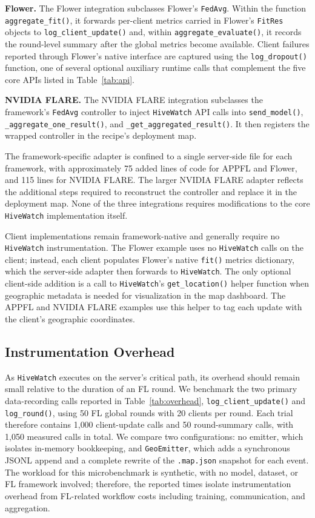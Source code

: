 \documentclass[preprint,12pt, a4paper]{elsarticle}
\begin{document}
\textbf{Flower.} The Flower integration subclasses Flower’s \texttt{FedAvg}.
Within the function \texttt{aggregate\_fit()}, it forwards per-client metrics carried in Flower's \texttt{FitRes} objects to \texttt{log\_client\_update()} and, within \texttt{aggregate\_evaluate()}, it records the round-level summary after the global metrics become available. Client failures reported through Flower's native interface are captured using the \texttt{log\_dropout()} function, one of several optional auxiliary runtime calls that complement the five core APIs listed in Table~\ref{tab:api}.

\textbf{NVIDIA FLARE.} The NVIDIA FLARE integration subclasses the framework's \texttt{FedAvg} controller to inject \texttt{HiveWatch} API calls into \texttt{send\_model()}, \texttt{\_aggregate\_one\_result()}, and \texttt{\_get\_aggregated\_result()}. It then registers the wrapped controller in the recipe's deployment map.

The framework-specific adapter is confined to a single server-side file for each framework, with approximately 75 added lines of code for APPFL and Flower, and 115 lines for NVIDIA FLARE. The larger NVIDIA FLARE adapter reflects the additional steps required to reconstruct the controller and replace it in the deployment map. None of the three integrations requires modifications to the core \texttt{HiveWatch} implementation itself.

Client implementations remain framework-native and generally require no \texttt{HiveWatch} instrumentation. The Flower example uses no \texttt{HiveWatch} calls on the client; instead, each client populates Flower's native \texttt{fit()} metrics dictionary, which the server-side adapter then forwards to \texttt{HiveWatch}. The only optional client-side addition is a call to \texttt{HiveWatch}'s \texttt{get\_location()} helper function when geographic metadata is needed for visualization in the map dashboard. The APPFL and NVIDIA FLARE examples use this helper to tag each update with the client's geographic coordinates.

\subsection{Instrumentation Overhead}

As \texttt{HiveWatch} executes on the server's critical path, its overhead should remain small relative to the duration of an FL round. We benchmark the two primary data-recording calls reported in Table~\ref{tab:overhead}, \texttt{log\_client\_update()} and \texttt{log\_round()}, using 50 FL global rounds with 20 clients per round. Each trial therefore contains 1{,}000 client-update calls and 50 round-summary calls, with 1{,}050 measured calls in total. We compare two configurations: no emitter, which isolates in-memory bookkeeping, and \texttt{GeoEmitter}, which adds a synchronous JSONL append and a complete rewrite of the \texttt{.map.json} snapshot for each event. The workload for this microbenchmark is synthetic, with no model, dataset, or FL framework involved; therefore, the reported times isolate instrumentation overhead from FL-related workflow costs including training, communication, and aggregation.
\end{document}
